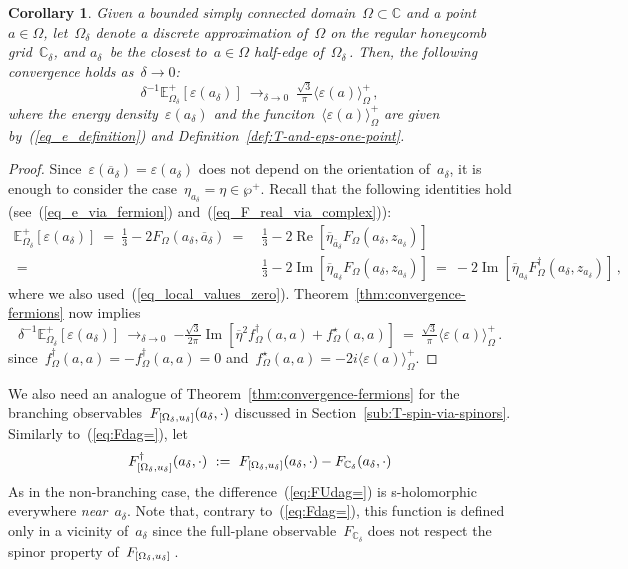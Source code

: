 \documentclass[reqno,11pt,a4paper]{amsart}
\newtheorem{corollary}[proposition]{Corollary}
\theoremstyle{remark}
\newcommand{\C}{\mathbb{C}}
\newcommand{\Edelta}{\mathbb{E}_{\Omega_\delta}}
\newcommand{\F}{F_\Omega}       \newcommand{\Fdelta}{F_{\Omega_\delta}}
\newcommand{\fstar}{f_{\Omega}^\star}
\newcommand{\freg}{f_{\Omega}^\dag}
\renewcommand\Re{\operatorname{Re}}
\renewcommand\Im{\operatorname{Im}}
\newcommand\Corr[1]{\langle #1 \rangle}
\newcommand\CorrO[2][+]{\Corr{#2}_\Omega^{#1}}
\begin{document}
\begin{corollary}
\label{cor:energy-density-convergence} Given a bounded simply connected domain~$\Omega\subset\C$ and a point~$a\in\Omega$, let~$\Omega_\delta$ denote a discrete approximation of~$\Omega$ on the regular honeycomb grid~$\C_\delta$, and $a_\delta$~be the closest to~$a\in\Omega$ half-edge of~$\Omega_\delta$\,. Then, the following convergence holds as~$\delta\to 0$:
\[
\delta^{-1}\Edelta^+[\varepsilon(a_\delta)]\ \mathop{\to}_{\delta\to 0}\ \tfrac{\sqrt{3}}{\pi}\CorrO{\varepsilon(a)}\,,
\]
where the energy density~$\varepsilon(a_\delta)$ and the funciton~$\CorrO{\varepsilon(a)}$ are given by~(\ref{eq_e_definition}) and Definition~\ref{def:T-and-eps-one-point}.
\end{corollary}

\begin{proof}
Since~$\varepsilon(\overline{a}_\delta)=\varepsilon(a_\delta)$ does not depend on the orientation of~$a_\delta$, it is enough to consider the case~$\eta_{a_\delta}=\eta\in\wp^+$. Recall that the following identities hold (see~(\ref{eq_e_via_fermion}) and~(\ref{eq_F_real_via_complex})):
\begin{align*}
\Edelta^+[\varepsilon(a_\delta)] ~=~ {\textstyle{\frac{1}{3}}}-2\F(a_\delta,\overline{a}_\delta)~=&~ \tfrac{1}{3}-2\Re[{\overline{\eta}_{\overline{a}_\delta}}\F(a_\delta,z_{a_\delta})] \\
~=&~ \tfrac{1}{3}-2\Im[{\overline{\eta}_{a_\delta}}\F(a_\delta,z_{a_\delta})] ~=~ -2\Im[{\overline{\eta}_{a_\delta}}\F^\dag(a_\delta,z_{a_\delta})]\,,
\end{align*}
where we also used~(\ref{eq_local_values_zero}). Theorem~\ref{thm:convergence-fermions} now implies
\[
\delta^{-1}\Edelta^+[\varepsilon(a_\delta)] ~\mathop{\to}_{\delta\to 0}~ {-\tfrac{\sqrt{3}}{2\pi}\Im}[{\overline{\eta}^2}\freg(a,a)+\fstar(a,a)]~=~\tfrac{\sqrt{3}}{\pi}\CorrO{\varepsilon(a)}\,.
\]
since~$\freg(a,a)=-\freg(a,a)=0$ and~$\fstar(a,a)=-{2i}\CorrO{\varepsilon(a)}$.
\end{proof}

We also need an analogue of Theorem~\ref{thm:convergence-fermions} for the branching observables~$F_{[\Omega_\delta,u_\delta]}(a_\delta,\cdot)$ discussed in Section~\ref{sub:T-spin-via-spinors}. Similarly to~(\ref{eq:Fdag=}), let
\begin{equation}
\label{eq:FUdag=}
\FdeltaU^\dag(a_\delta,\cdot)~:=~\FdeltaU(a_\delta,\cdot)-F_{\C_\delta}(a_\delta,\cdot)
\end{equation}
As in the non-branching case, the difference~(\ref{eq:FUdag=}) is s-holomorphic everywhere \emph{near}~$a_\delta$. Note that, contrary to~(\ref{eq:Fdag=}), this function is defined only in a vicinity of~$a_\delta$ since the full-plane observable~$F_{\C_\delta}$ does not respect the spinor property of~$F_{[\Omega_\delta,u_\delta]}$\,.
\end{document}
